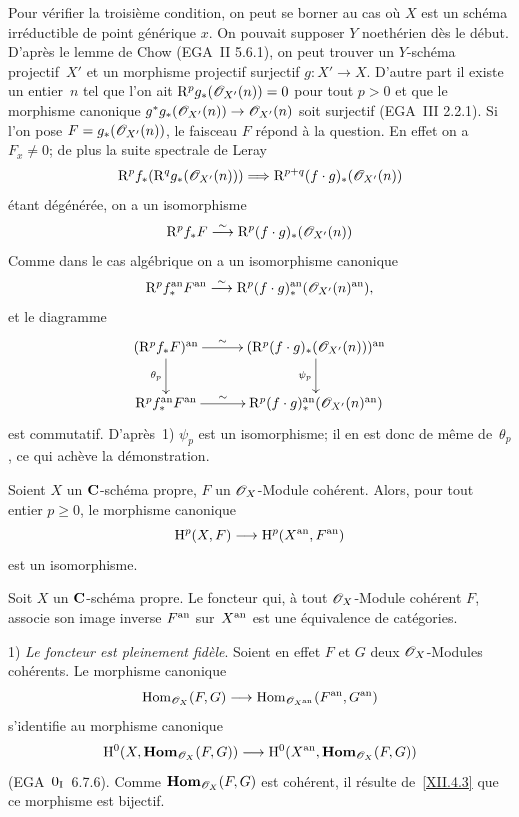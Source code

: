 Pour v\'erifier la troisi\`eme condition, on peut se borner au cas
o\`u $X$ est un sch\'ema irr\'eductible de point
g\'en\'erique $x$. On pouvait supposer $Y$ noeth\'erien d\`es
le d\'ebut. D'apr\`es le lemme de Chow (EGA~II 5.6.1), on peut
trouver un $Y$-sch\'ema projectif~$X'$ et un morphisme projectif
surjectif $g \colon X' \to X$. D'autre part il existe un entier~$n$
tel que l'on ait $\R^p g_* (\cal{O}_{X'} (n)) = 0 $ pour tout $p>0$ et
que le morphisme canonique $g^* g_* (\cal{O}_{X'} (n)) \to
\cal{O}_{X'} (n)$ soit surjectif (EGA~III 2.2.1). Si l'on pose
$F = g_* (\cal{O}_{X'} (n)) $, le faisceau $F$ r\'epond
\`a la question. En effet on a $F_x \neq 0$; de plus la suite
spectrale de Leray
$$
\R^p f_* (\R^q g_* (\cal{O}_{X'} (n))) \To \R^{p+q}
(f\cdot g)_* (\cal{O}_{X'} (n))
$$
\'etant d\'eg\'en\'er\'ee, on a un isomorphisme
$$
\R^p f_* F \isomto \R^p (f\cdot g)_* (\cal{O}_{X'} (n))
$$
Comme dans le cas alg\'ebrique on a un isomorphisme canonique
$$\R^p f_*^\an F^\an \isomto
\R^p (f\cdot g)_*^\an (\cal{O}_{X'}(n)^\an ),$$
et le diagramme
$$
\xymatrix@C=1cm{{(\R^p f_* F)^\an}\ar[d]_{\theta_p}\ar[r]^-{\sim}&{(\R^p (f\cdot g)_* (\cal{O}_{X'} (n)))^\an}\ar[d]_{\psi_p}\\{\R^p f_*^\an F^\an}\ar[r]^-{\sim}&{\R^p (f\cdot g)_*^\an
(\cal{O}_{X'}(n)^\an)}}
$$
est commutatif. D'apr\`es~1) $\psi_p $ est un isomorphisme; il en
est donc de m\^eme de~$\theta_p$, ce qui ach\`eve la
d\'emonstration.

\begin{corollaire}
\label{XII.4.3}
Soient $X$ un $\mathbf{C}$-sch\'ema propre, $F$ un $\cal{O}_X$-Module
coh\'erent. Alors, pour tout entier $p\geq 0$, le morphisme
canonique
$$
\H^p(X,F)\to \H^p(X^{\an},F^{\an})
$$
est un isomorphisme.
\end{corollaire}

\begin{theoreme}
\label{XII.4.4}
Soit $X$ un $\mathbf{C}$-sch\'ema propre. Le foncteur qui, \`a tout
$\cal{O}_X$-Module coh\'erent $F$, associe son image inverse
$F^{\mathrm{an}}$ sur~$X^{\mathrm{an}}$ est une \'equivalence de cat\'egories.
\end{theoreme}

1) \emph{Le foncteur est pleinement fidèle}. Soient en effet $F$
et $G$ deux $\cal{O}_X$-Modules coh\'erents. Le morphisme canonique
$$
\Hom_{\cal{O}_X}(F,G)\to \Hom_{\cal{O}_{X^{\an}}}(F^{\an},G^{\an})
$$
s'identifie au morphisme canonique
$$
\H^0(X,\SheafHom_{\cal{O}_X}(F,G))\to
\H^0(X^{\an},\SheafHom_{\cal{O}_X}(F,G))
$$
(EGA~$0_{\textup{I}}$~6.7.6). Comme $\SheafHom_{\cal{O}_X}(F,G)$ est
coh\'erent, il r\'esulte de~\ref{XII.4.3} que ce morphisme est
bijectif.

